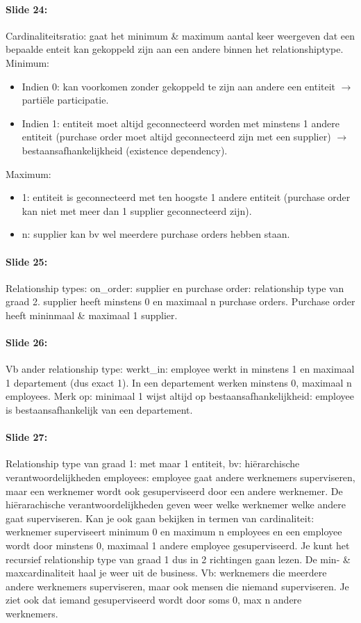 \documentclass[10pt,a4paper]{report}
\begin{document}
\paragraph{Slide 24:}Cardinaliteitsratio: gaat het minimum \& maximum aantal keer weergeven dat een bepaalde enteit kan gekoppeld zijn aan een andere binnen het relationshiptype.\\
Minimum:
\begin{itemize}
\item Indien 0: kan voorkomen zonder gekoppeld te zijn aan andere een entiteit $\rightarrow$ partiële participatie.
\item Indien 1: entiteit moet altijd geconnecteerd worden met minstens 1 andere entiteit (purchase order moet altijd geconnecteerd zijn met een supplier) $\rightarrow$ bestaansafhankelijkheid (existence dependency).
\end{itemize}
Maximum:
\begin{itemize}
\item 1: entiteit is geconnecteerd met ten hoogste 1 andere entiteit (purchase order kan niet met meer dan 1 supplier geconnecteerd zijn).
\item n: supplier kan bv wel meerdere purchase orders hebben staan.
\end{itemize}

\paragraph{Slide 25:}Relationship types: on\_order: supplier en purchase order: relationship type van graad 2. supplier heeft minstens 0 en maximaal n purchase orders. Purchase order heeft mininmaal \& maximaal 1 supplier.

\paragraph{Slide 26:}Vb ander relationship type: werkt\_in: employee werkt in minstens 1 en maximaal 1 departement (dus exact 1). In een departement werken minstens 0, maximaal n employees. Merk op: minimaal 1 wijst altijd op bestaansafhankelijkheid: employee is bestaansafhankelijk van een departement.

\paragraph{Slide 27:}Relationship type van graad 1: met maar 1 entiteit, bv: hiërarchische verantwoordelijkheden employees: employee gaat andere werknemers superviseren, maar een werknemer wordt ook gesuperviseerd door een andere werknemer. De hiërarachische verantwoordelijkheden geven weer welke werknemer welke andere gaat superviseren. Kan je ook gaan bekijken in termen van cardinaliteit: werknemer superviseert minimum 0 en maximum n employees en een employee wordt door minstens 0, maximaal 1 andere employee gesuperviseerd. Je kunt het recursief relationship type van graad 1 dus in 2 richtingen gaan lezen. De min- \& maxcardinaliteit haal je weer uit de business. Vb: werknemers die meerdere andere werknemers superviseren, maar ook mensen die niemand superviseren. Je ziet ook dat iemand gesuperviseerd wordt door soms 0, max n andere werknemers.
\end{document}
